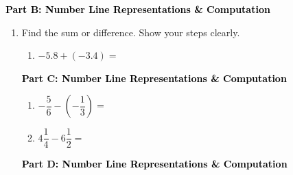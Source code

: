 \documentclass[12pt, letterpaper, fleqn]{article}
\newcommand{\blank}{\underline{\hspace{2.2cm}}}
\begin{document}
\newpage

\begin{tcolorbox}[colback=customteal!20]
\large\textcolor{black}{\textbf{Part B: Number Line Representations \& Computation}}
\end{tcolorbox}

\vspace{3mm}

\begin{enumerate}[itemsep=4.2cm, leftmargin=0.6cm, resume]
\item Find the sum or difference. Show your steps clearly.
\begin{enumerate}[label=\alph*., itemsep=\fill]
\item $-5.8 + (-3.4) =$ \blank
\end{enumerate}

\newpage

\begin{tcolorbox}[colback=customteal!20]
\large\textcolor{black}{\textbf{Part C: Number Line Representations \& Computation}}
\end{tcolorbox}

\vspace{3mm}

\begin{enumerate}[itemsep=4.2cm, leftmargin=0.6cm, resume]
\item $-\dfrac{5}{6} - \left(-\dfrac{1}{3}\right) =$ \blank
\item $4\dfrac{1}{4} - 6\dfrac{1}{2} =$ \blank
\end{enumerate}

\newpage

\begin{tcolorbox}[colback=customteal!20]
\large\textcolor{black}{\textbf{Part D: Number Line Representations \& Computation}}
\end{tcolorbox}

\vspace{3mm}


\end{enumerate}
\end{document}
